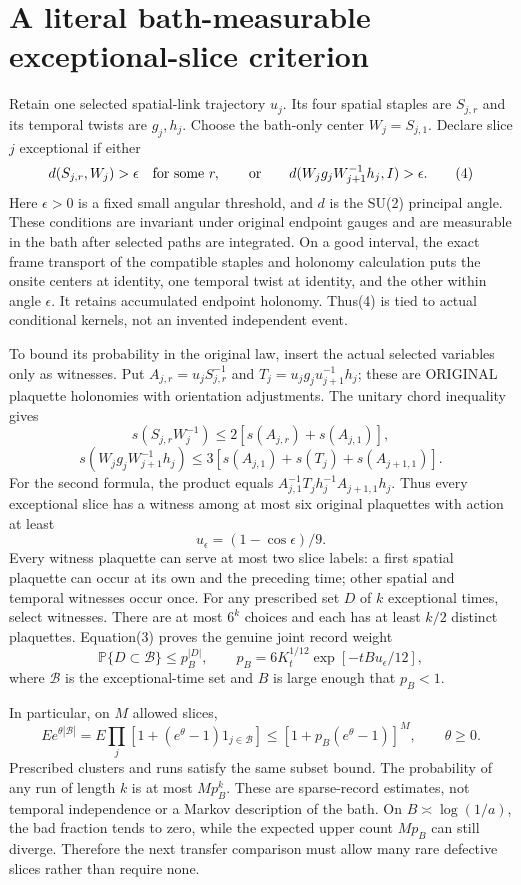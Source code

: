 \documentclass{article}
\begin{document}
\section*{A literal bath-measurable exceptional-slice criterion}
Retain one selected spatial-link trajectory $u_j$. Its four spatial staples are $S_{j,r}$ and its temporal twists are $g_j,h_j$. Choose the bath-only center $W_j=S_{j,1}$. Declare slice $j$ exceptional if either
\[
 d(S_{j,r},W_j)>\epsilon\quad\hbox{for some }r,
 \qquad\hbox{or}\qquad
 d(W_jg_jW_{j+1}^{-1}h_j,I)>\epsilon.                 \tag{4}
\]
Here $\epsilon>0$ is a fixed small angular threshold, and $d$ is the SU(2) principal angle. These conditions are invariant under original endpoint gauges and are measurable in the bath after selected paths are integrated. On a good interval, the exact frame transport of the compatible staples and holonomy calculation puts the onsite centers at identity, one temporal twist at identity, and the other within angle $\epsilon$. It retains accumulated endpoint holonomy. Thus(4) is tied to actual conditional kernels, not an invented independent event.

To bound its probability in the original law, insert the actual selected variables only as witnesses. Put $A_{j,r}=u_jS_{j,r}^{-1}$ and $T_j=u_jg_ju_{j+1}^{-1}h_j$; these are ORIGINAL plaquette holonomies with orientation adjustments. The unitary chord inequality gives
\[
 s(S_{j,r}W_j^{-1})\le2[s(A_{j,r})+s(A_{j,1})],
\]
\[
 s(W_jg_jW_{j+1}^{-1}h_j)
 \le3[s(A_{j,1})+s(T_j)+s(A_{j+1,1})].              \tag{5}
\]
For the second formula, the product equals
$A_{j,1}^{-1}T_j h_j^{-1}A_{j+1,1}h_j$.
Thus every exceptional slice has a witness among at most six original plaquettes with action at least
\[
 u_\epsilon=(1-\cos\epsilon)/9.                     \tag{6}
\]
Every witness plaquette can serve at most two slice labels: a first spatial plaquette can occur at its own and the preceding time; other spatial and temporal witnesses occur once. For any prescribed set $D$ of $k$ exceptional times, select witnesses. There are at most $6^k$ choices and each has at least $k/2$ distinct plaquettes. Equation(3) proves the genuine joint record weight
\[
 \mathbb P\{D\subset\mathcal B\}\le p_B^{|D|},\qquad
 p_B=6K_t^{1/12}\exp[-tB u_\epsilon/12],             \tag{7}
\]
where $\mathcal B$ is the exceptional-time set and $B$ is large enough that $p_B<1$.

In particular, on $M$ allowed slices,
\[
 E e^{\theta|\mathcal B|}
 =E\prod_j[1+(e^\theta-1)1_{j\in\mathcal B}]
 \le[1+p_B(e^\theta-1)]^M,\qquad\theta\ge0.          \tag{8}
\]
Prescribed clusters and runs satisfy the same subset bound. The probability of any run of length $k$ is at most $M p_B^k$. These are sparse-record estimates, not temporal independence or a Markov description of the bath. On $B\asymp\log(1/a)$, the bad fraction tends to zero, while the expected upper count $Mp_B$ can still diverge. Therefore the next transfer comparison must allow many rare defective slices rather than require none.
\end{document}
